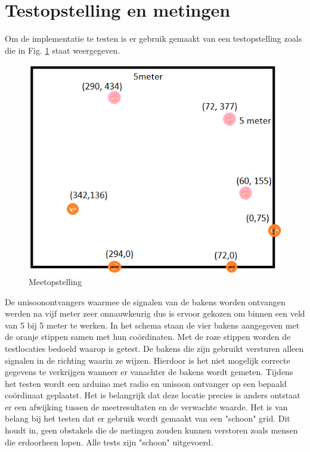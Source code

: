 \documentclass{article}
\begin{document}
\section{Testopstelling en metingen}
Om de implementatie te testen is er gebruik gemaakt van een testopstelling zoals die in Fig. \ref{Meetopstelling} staat weergegeven.
\begin{figure}[h] 
\centering\includegraphics[scale=0.5]{Meetopstelling.png}
\caption{Meetopstelling}
\label{Meetopstelling}
\end{figure}
De unisoonontvangers waarmee de signalen van de bakens worden ontvangen werden na vijf meter zeer onnauwkeurig dus is ervoor gekozen om binnen een veld van 5 bij 5 meter te werken. In het schema staan de vier bakens aangegeven met de oranje stippen samen met hun co\"{o}rdinaten. Met de roze stippen worden de testlocaties bedoeld waarop is getest. De bakens die zijn gebruikt versturen alleen signalen in de richting waarin ze wijzen. Hierdoor is het niet mogelijk correcte gegevens te verkrijgen wanneer er vanachter de bakens wordt gemeten. 
\newline
Tijdens het testen wordt een arduino met radio en unisoon ontvanger op een bepaald co\"{o}rdinaat geplaatst. Het is belangrijk dat deze locatie precies is anders ontstaat er een afwijking tussen de meetresultaten en de verwachte waarde. 
Het is van belang bij het testen dat er gebruik wordt gemaakt van een "schoon" grid. Dit houdt in, geen obstakels die de metingen zouden kunnen verstoren zoals mensen die erdoorheen lopen. Alle tests zijn "schoon" uitgevoerd. 
\end{document}
